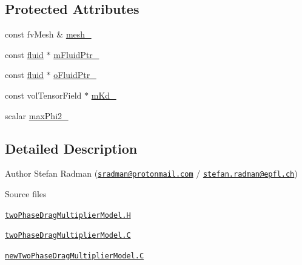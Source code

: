 \subsection*{Protected Attributes}
\begin{DoxyCompactItemize}
\item 
const fv\+Mesh \& \hyperlink{classFoam_1_1twoPhaseDragMultiplierModel_a23edeeeecebcef11921a33dd5d990570}{mesh\+\_\+}
\item 
const \hyperlink{classFoam_1_1fluid}{fluid} $\ast$ \hyperlink{classFoam_1_1twoPhaseDragMultiplierModel_a7370e1ce57039532adf69796d6fe27f5}{m\+Fluid\+Ptr\+\_\+}
\item 
const \hyperlink{classFoam_1_1fluid}{fluid} $\ast$ \hyperlink{classFoam_1_1twoPhaseDragMultiplierModel_aa9093cc2756eabf636ce002235646214}{o\+Fluid\+Ptr\+\_\+}
\item 
const vol\+Tensor\+Field $\ast$ \hyperlink{classFoam_1_1twoPhaseDragMultiplierModel_ab64bf84b8a31713b9473c9d8562ff24f}{m\+Kd\+\_\+}
\item 
scalar \hyperlink{classFoam_1_1twoPhaseDragMultiplierModel_a7b64d94c8ee5e650272a6d9e2d95e394}{max\+Phi2\+\_\+}
\end{DoxyCompactItemize}


\subsection{Detailed Description}
Author Stefan Radman (\href{mailto:sradman@protonmail.com}{\tt sradman@protonmail.\+com} / \href{mailto:stefan.radman@epfl.ch}{\tt stefan.\+radman@epfl.\+ch}) 

\label{_Description}%
 \begin{DoxyParagraph}{Source files}

\begin{DoxyItemize}
\item \href{../../../home/carlo/data/GeN-Foam/GeN-Foam_ffn/GeN-Foam/GeN-Foam/classes/thermalHydraulics/src/physicsModels/dragModels/twoPhaseDragMultiplierModels/twoPhaseDragMultiplierModel.H}{\tt two\+Phase\+Drag\+Multiplier\+Model.\+H} 
\item \href{../../../home/carlo/data/GeN-Foam/GeN-Foam_ffn/GeN-Foam/GeN-Foam/classes/thermalHydraulics/src/physicsModels/dragModels/twoPhaseDragMultiplierModels/twoPhaseDragMultiplierModel.C}{\tt two\+Phase\+Drag\+Multiplier\+Model.\+C} 
\item \href{../../../home/carlo/data/GeN-Foam/GeN-Foam_ffn/GeN-Foam/GeN-Foam/classes/thermalHydraulics/src/physicsModels/dragModels/twoPhaseDragMultiplierModels/newTwoPhaseDragMultiplierModel.C}{\tt new\+Two\+Phase\+Drag\+Multiplier\+Model.\+C} 
\end{DoxyItemize}
\end{DoxyParagraph}


